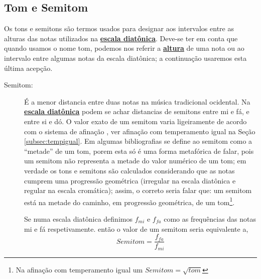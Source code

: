 \subsection{Tom e Semitom}
\label{subsec:tomesemitom}

Os tons e semitons são termos usados para designar aos intervalos entre as alturas das notas utilizados na 
\hyperref[sec:pos:Diatonica]{\textbf{escala diatônica}}.
Deve-se ter em conta que quando usamos o nome tom,
podemos nos referir a \hyperref[sec:pos:Altura]{\textbf{altura}} 
de uma nota ou ao intervalo entre algumas notas da escala diatônica;
a continuação usaremos esta última acepção.

\begin{description}

\item [Semitom:] \label{sec:pos:Semitom}
É a menor distancia entre duas notas na música tradicional ocidental.
Na \hyperref[sec:pos:Diatonica]{\textbf{escala diatônica}} 
podem se achar distancias de semitons entre mi e fá, e entre si e dó.
O valor exato de um semitom varia ligeiramente de acordo com o sistema de afinação \cite[pp. 30]{cardoso1973curso}\cite[pp. 762]{apel1969harvard}, ver afinação com temperamento igual na Seção \ref{subsec:tempigual}. 
Em algumas bibliografias se define ao semitom como a ``metade'' de um tom, 
porem esta só é uma forma metafórica de falar, 
pois um semitom não representa a metade do valor numérico de um tom;
em verdade os tons e semitons são calculados considerando que as notas cumprem uma progressão geométrica
(irregular na escala diatônica e regular na escala cromática);
assim, o correto seria falar que: um semitom está na metade do caminho, em progressão geométrica, de um tom\footnote{Na 
afinação com temperamento igual um $Semitom=\sqrt{tom}$}.
\begin{example}
Se numa escala diatônica definimos $f_{mi}$ e $f_{fa}$ como as frequências das notas mi e fá respetivamente.
então o valor de um semitom seria equivalente a,
\begin{equation*}
Semitom=\frac{f_{fa}}{f_{mi}}
\end{equation*}
\end{example}


\end{description}
